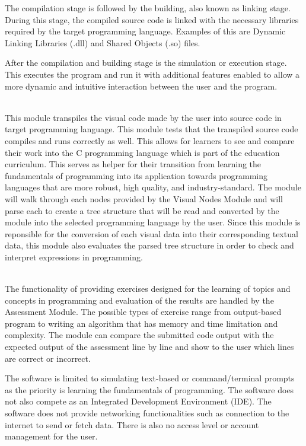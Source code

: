 \parx
The compilation stage is followed by the building, also known as linking stage.
During this stage, the compiled source code is linked with the necessary libraries
required by the target programming language. Examples of this are Dynamic Linking
Libraries (.dll) and Shared Objects (.so) files.

\parx
After the compilation and building stage is the simulation or execution stage.  This
executes the program and run it with additional features enabled to allow a more
dynamic and intuitive interaction between the user and the program.

\flushleft
\textbf{}\\
\justifying
\parx
This module transpiles the visual code made by the user into source code in target
programming language. This module tests that the transpiled source code compiles
and runs correctly as well. This allows for learners to see and compare their
work into the C programming language which is part of the education curriculum.
This serves as helper for their transition from learning the fundamentals of
programming into its application towards programming languages that are more
robust, high quality, and industry-standard. The module will walk through each
nodes provided by the Visual Nodes Module and will parse each to create a tree
structure that will be read and converted by the module into the selected
programming language by the user.  Since this module is reponsible for the
conversion of each visual data into their corresponding textual data, this
module also evaluates the parsed tree structure in order to check and interpret
expressions in programming.

\flushleft
\textbf{}\\
\justifying
\parx
The functionality of providing exercises designed for the learning of topics and
concepts in programming and evaluation of the results are handled by the Assessment
Module. The possible types of exercise range from output-based program to writing
an algorithm that has memory and time limitation and complexity. The module can
compare the submitted code output with the expected output of the assessment line
by line and show to the user which lines are correct or incorrect.

\parx
The software is limited to simulating text-based or command/terminal prompts as the
priority is learning the fundamentals of programming. The software does not also
compete as an Integrated Development Environment (IDE). The software does not provide
networking functionalities such as connection to the internet to send or fetch data.
There is also no access level or account management for the user.\\
